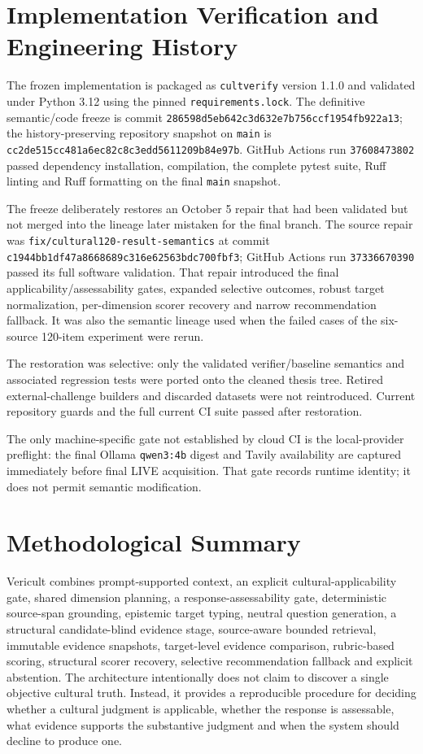 \section{Implementation Verification and Engineering History}

The frozen implementation is packaged as \texttt{cultverify} version 1.1.0 and validated under Python 3.12 using the pinned \texttt{requirements.lock}. The definitive semantic/code freeze is commit \texttt{286598d5eb642c3d632e7b756ccf1954fb922a13}; the history-preserving repository snapshot on \texttt{main} is \texttt{cc2de515cc481a6ec82c8c3edd5611209b84e97b}. GitHub Actions run \texttt{37608473802} passed dependency installation, compilation, the complete pytest suite, Ruff linting and Ruff formatting on the final \texttt{main} snapshot.

The freeze deliberately restores an October 5 repair that had been validated but not merged into the lineage later mistaken for the final branch. The source repair was \texttt{fix/cultural120-result-semantics} at commit \texttt{c1944bb1df47a8668689c316e62563bdc700fbf3}; GitHub Actions run \texttt{37336670390} passed its full software validation. That repair introduced the final applicability/assessability gates, expanded selective outcomes, robust target normalization, per-dimension scorer recovery and narrow recommendation fallback. It was also the semantic lineage used when the failed cases of the six-source 120-item experiment were rerun.

The restoration was selective: only the validated verifier/baseline semantics and associated regression tests were ported onto the cleaned thesis tree. Retired external-challenge builders and discarded datasets were not reintroduced. Current repository guards and the full current CI suite passed after restoration.

The only machine-specific gate not established by cloud CI is the local-provider preflight: the final Ollama \texttt{qwen3:4b} digest and Tavily availability are captured immediately before final LIVE acquisition. That gate records runtime identity; it does not permit semantic modification.

\section{Methodological Summary}

Vericult combines prompt-supported context, an explicit cultural-applicability gate, shared dimension planning, a response-assessability gate, deterministic source-span grounding, epistemic target typing, neutral question generation, a structural candidate-blind evidence stage, source-aware bounded retrieval, immutable evidence snapshots, target-level evidence comparison, rubric-based scoring, structural scorer recovery, selective recommendation fallback and explicit abstention. The architecture intentionally does not claim to discover a single objective cultural truth. Instead, it provides a reproducible procedure for deciding whether a cultural judgment is applicable, whether the response is assessable, what evidence supports the substantive judgment and when the system should decline to produce one.

